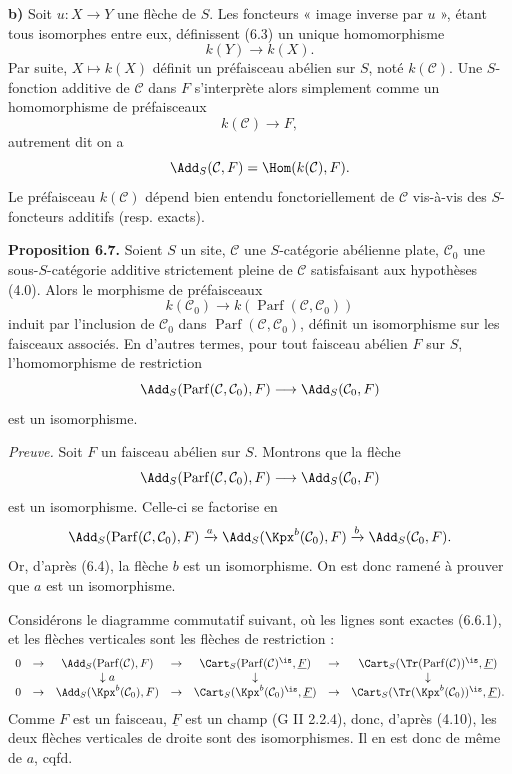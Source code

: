 \documentclass[11pt]{article}
\newcommand{\Parf}{\operatorname{Parf}}
\begin{document}
\textbf{b)} Soit \(u:X\to Y\) une flèche de \(S\). Les foncteurs « image inverse par \(u\) », étant tous isomorphes entre eux, définissent (6.3) un unique homomorphisme
\[
  k(Y)\longrightarrow k(X).
\]
Par suite, \(X\mapsto k(X)\) définit un préfaisceau abélien sur \(S\), noté \(k(\mathcal C)\). Une \(S\)-fonction additive de \(\mathcal C\) dans \(F\) s'interprète alors simplement comme un homomorphisme de préfaisceaux
\[
  k(\mathcal C)\longrightarrow F,
\]
autrement dit on a
\[
  \Add_S(\mathcal C,F)=\Hom(k(\mathcal C),F).
\]
Le préfaisceau \(k(\mathcal C)\) dépend bien entendu fonctoriellement de \(\mathcal C\) vis-à-vis des \(S\)-foncteurs additifs (resp. exacts).

\textbf{Proposition 6.7.} Soient \(S\) un site, \(\mathcal C\) une \(S\)-catégorie abélienne plate, \(\mathcal C_0\) une sous-\(S\)-catégorie additive strictement pleine de \(\mathcal C\) satisfaisant aux hypothèses (4.0). Alors le morphisme de préfaisceaux
\[
  k(\mathcal C_0)\longrightarrow k(\Parf(\mathcal C,\mathcal C_0))
\]
induit par l'inclusion de \(\mathcal C_0\) dans \(\Parf(\mathcal C,\mathcal C_0)\), définit un isomorphisme sur les faisceaux associés. En d'autres termes, pour tout faisceau abélien \(F\) sur \(S\), l'homomorphisme de restriction
\[
  \Add_S(\Parf(\mathcal C,\mathcal C_0),F)
  \longrightarrow
  \Add_S(\mathcal C_0,F)
\]
est un isomorphisme.

\emph{Preuve.} Soit \(F\) un faisceau abélien sur \(S\). Montrons que la flèche
\[
  \Add_S(\Parf(\mathcal C,\mathcal C_0),F)
  \longrightarrow
  \Add_S(\mathcal C_0,F)
\]
est un isomorphisme. Celle-ci se factorise en
\[
\Add_S(\Parf(\mathcal C,\mathcal C_0),F)
 \xrightarrow{a}
\Add_S(\Kpx^b(\mathcal C_0),F)
 \xrightarrow{b}
\Add_S(\mathcal C_0,F).
\]
Or, d'après (6.4), la flèche \(b\) est un isomorphisme. On est donc ramené à prouver que \(a\) est un isomorphisme.

Considérons le diagramme commutatif suivant, où les lignes sont exactes (6.6.1), et les flèches verticales sont les flèches de restriction :
\[
\begin{array}{ccccccccc}
0&\to&\Add_S(\Parf(\mathcal C),F)&\to&\Cart_S(\Parf(\mathcal C)^{\is},\underline F)&\to&\Cart_S(\Tr(\Parf(\mathcal C))^{\is},\underline F)\\
&&\downarrow a&&\downarrow&&\downarrow\\
0&\to&\Add_S(\Kpx^b(\mathcal C_0),F)&\to&\Cart_S(\Kpx^b(\mathcal C_0)^{\is},\underline F)&\to&\Cart_S(\Tr(\Kpx^b(\mathcal C_0))^{\is},\underline F).
\end{array}
\]
Comme \(F\) est un faisceau, \(\underline F\) est un champ (G II 2.2.4), donc, d'après (4.10), les deux flèches verticales de droite sont des isomorphismes. Il en est donc de même de \(a\), cqfd.
\end{document}
